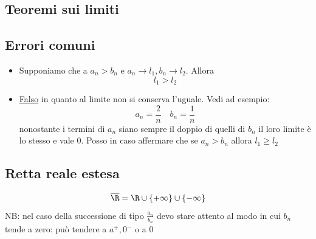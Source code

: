 \subsection{Teoremi sui limiti}
\label{sub:teoremilimiti}
\label{teoconfrontoadue}
\label{teoconfrontoatre}
\subsection{Errori comuni}
\begin{itemize}
	\item Supponiamo che a $a_n > b_n$ e $a_n \to l_1, b_n \to l_2$. Allora \[
	l_1 > l_2
	\] 
	\item \underline{Falso} in quanto al limite non si conserva l'uguale. Vedi ad esempio:
	\[
	a_n = \frac{2}{n} \quad b_n = \frac{1}{n}
	\] 
	nonostante i termini di $a_n$ siano sempre il doppio di quelli di $ b_n$ il loro limite è lo stesso e vale 0. Posso in caso affermare che se $a_n > b_n$ allora $l_1 \ge l_2$
\end{itemize}

\subsection{Retta reale estesa}
\label{sub:rettarealeestesa}
\[
\overline{\R} = \R \cup \left\{ +\infty \right\} \cup \left\{ - \infty \right\} 
\] 
NB: nel caso della successione di tipo $\frac{a_n}{b_n}$ devo stare attento al modo in cui $b_n$ tende a zero: può tendere a $a^{+}, 0 ^{-}$ o a $0$

